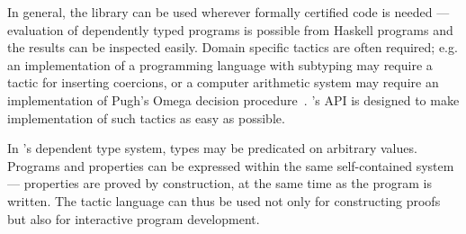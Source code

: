 In general, the library can be used wherever formally certified code
is needed --- evaluation of dependently typed \Ivor{} programs is
possible from Haskell programs and the results can be inspected
easily.  Domain specific tactics are often required; e.g. an
implementation of a programming language with subtyping may require a
tactic for inserting coercions, or a computer arithmetic system may
require an implementation of Pugh's Omega decision
procedure~\cite{pugh-omega}.  \Ivor{}'s API is designed to make
implementation of such tactics as easy as possible.

In \Ivor{}'s dependent type system, types may be predicated on
arbitrary values. Programs and properties can be
expressed within the same self-contained system --- properties are
proved by construction, at the same time as the program is
written. The tactic language can thus be used not only for
constructing proofs but also for interactive program development.


